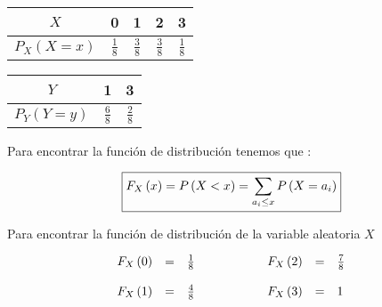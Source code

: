\documentclass[12pt]{article}
\begin{document}
\begin{center}
    \renewcommand{\arraystretch}{1.5}
    \begin{tabular}{|c|c|c|c|c|}
        \hline
        $X$                   & 0             & 1             & 2             & 3
        \\
        \hline
        $P_X\left(X=x\right)$ & $\frac{1}{8}$ & $\frac{3}{8}$ & $\frac{3}{8}$ & $\frac{1}{8}$
        \\
        \hline
    \end{tabular}
\end{center}


\begin{center}
    \renewcommand{\arraystretch}{1.5}
    \begin{tabular}{|c|c|c|}
        \hline
        $Y$                   & 1             & 3
        \\
        \hline
        $P_Y\left(Y=y\right)$ & $\frac{6}{8}$ & $\frac{2}{8}$
        \\
        \hline
    \end{tabular}
\end{center}


\begin{flushleft}
    Para encontrar la funci\'on de distribuci\'on tenemos que :
\end{flushleft}



\begin{equation*}
    \fbox{$\displaystyle
            F_X\left(x\right) = P \left(X <x\right) =  \sum_{a_i\le x} P \left(X = a_i\right)
        $}
\end{equation*}


\begin{flushleft}
    Para encontrar la funci\'on de distribuci\'on de la variable aleatoria $X$
\end{flushleft}


\begin{equation*}
    \begin{array}{cp{1cm}c}


        \begin{array}{rcl}
            F_X\left(0\right) & = & \frac{1}{8}
            \\
            \\
            F_X\left(1\right) & = & \frac{4}{8}
        \end{array}
         &
         &
        \begin{array}{rcl}
            F_X\left(2\right) & = & \frac{7}{8}
            \\
            \\
            F_X\left(3\right) & = & 1
        \end{array}
    \end{array}
\end{equation*}
\end{document}
